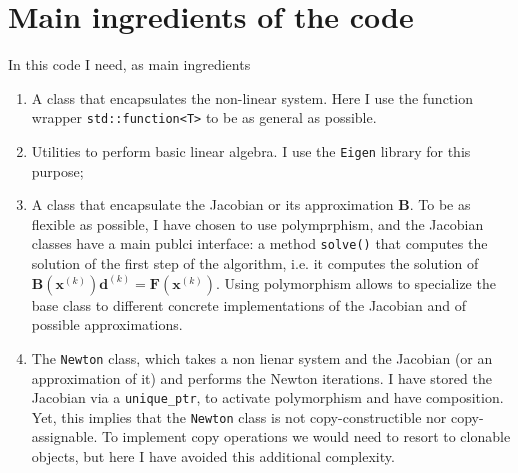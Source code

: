 \documentclass{article}
\newcommand{\li}{\lstinline}
\newcommand{\cpp}[1]{\li!#1!}
\begin{document}
\section{Main ingredients of the code}
In this code I need, as main ingredients
\begin{enumerate}
    \item A class that encapsulates the non-linear system. Here I use the function wrapper \cpp{std::function<T>} to be as general as possible. 
    \item Utilities to perform basic linear algebra. I use the \texttt{Eigen} library for this purpose;
    \item A class that encapsulate the Jacobian or its approximation $\mathbf{B}$. To be as flexible as possible, I have chosen to use polymprphism, and the Jacobian classes have a main publci interface: a method \cpp{solve()} that computes the solution of
    the first step of the algorithm, i.e. it computes the solution of $\mathbf{B}(\mathbf{x}^{(k)})\mathbf{d}^{(k)}=\mathbf{F}(\mathbf{x}^{(k)})$. Using polymorphism allows to specialize the base class to different concrete implementations of the Jacobian and of possible approximations.
    \item The \cpp{Newton} class, which takes a non lienar system and the Jacobian (or an approximation of it) and performs the Newton iterations. I have stored the Jacobian via a \cpp{unique_ptr}, to activate polymorphism and have composition. Yet, 
    this implies that the \cpp{Newton} class is not copy-constructible nor copy-assignable. To implement copy operations we would need to resort to clonable objects, but here I have avoided this additional complexity.
\end{enumerate}
\end{document}
